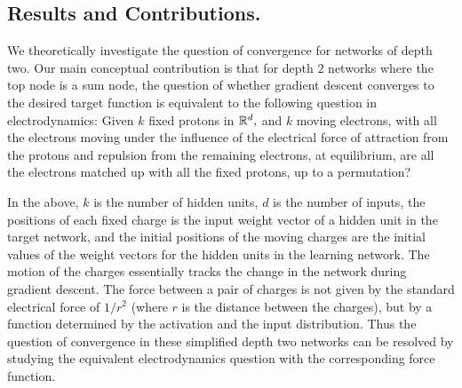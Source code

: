 \subsection{Results and Contributions.} 
We theoretically investigate the question of convergence for networks of depth two.
Our main conceptual contribution is that for depth $2$ networks where the top node is a sum node, the question of whether gradient descent converges to the desired target function is equivalent to the following question in electrodynamics: Given $k$ fixed protons in $\mathbb R^d,$ and $k$ moving electrons,
with all the electrons moving under the influence of the 
electrical force of attraction from the protons and repulsion from the remaining electrons,
at equilibrium, are all the electrons matched up with all the fixed protons, up to a permutation?  

In the above, $k$ is the number of hidden units, $d$ is the number of inputs, the positions of each fixed charge is the input weight vector of
a hidden unit in the target network, and the initial positions of the moving charges are the initial values of the weight vectors for the hidden units in the learning network. The motion of the charges essentially tracks the change in the network during gradient descent. The force between a pair of charges is not given by the standard electrical force of $1/r^2$ (where $r$ is the distance between the charges), but by a function determined by the activation and the input distribution. Thus the question of convergence in these simplified depth two networks can be resolved by studying the equivalent electrodynamics question with the corresponding force function.
%

